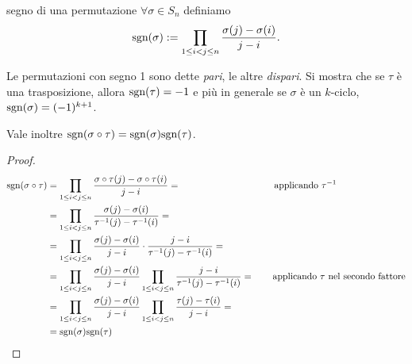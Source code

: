 \begin{definition}{segno di una permutazione}
    $\forall \sigma \in S_n$ definiamo \[ \text{sgn}(\sigma) := \prod_{1\leq i<j\leq n} \frac{\sigma(j)-\sigma(i)}{j-i}. \]
\end{definition}
Le permutazioni con segno 1 sono dette \emph{pari}, le altre \emph{dispari}. Si mostra che se $\tau$ è una trasposizione, allora $\text{sgn}(\tau) = -1$ e più in generale se $\sigma$ è un $k$-ciclo, $\text{sgn}(\sigma) = (-1)^{k+1}$.

Vale inoltre $\text{sgn} (\sigma \circ \tau) = \text{sgn} (\sigma)\text{sgn}(\tau)$.
    \begin{proof}
        \begin{align*}
            \text{sgn}(\sigma \circ \tau) & =  \prod_{1\leq i<j\leq n} \frac{\sigma \circ \tau(j)-\sigma \circ \tau(i)}{j-i} = \qquad\qquad\qquad\qquad\qquad\text{applicando $\tau^{-1}$}\\
            & = \prod_{1\leq i<j\leq n} \frac{\sigma(j)-\sigma(i)}{\tau^{-1}(j)-\tau^{-1}(i)} = \\
            & = \prod_{1\leq i<j\leq n} \frac{\sigma(j)-\sigma(i)}{j-i}\cdot \frac{j-i}{\tau^{-1}(j)-\tau^{-1}(i)} = \\
            & = \prod_{1\leq i<j\leq n} \frac{\sigma(j)-\sigma(i)}{j-i} \prod_{1\leq i<j\leq n}  \frac{j-i}{\tau^{-1}(j)-\tau^{-1}(i)} = \qquad \text{applicando $\tau$ nel secondo fattore}\\
            & = \prod_{1\leq i<j\leq n} \frac{\sigma(j)-\sigma(i)}{j-i} \prod_{1\leq i<j\leq n}  \frac{\tau(j)-\tau(i)}{j-i} = \\
            & = \text{sgn}(\sigma)\text{sgn}(\tau)
        \end{align*}
    \end{proof}
    
